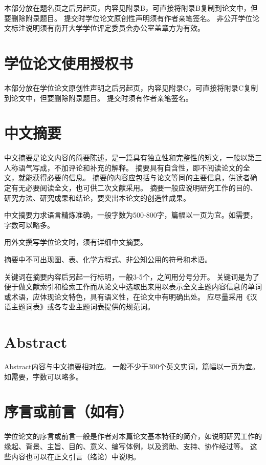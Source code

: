 本部分放在题名页之后另起页，内容见附录B，可直接将附录B复制到论文中，但要删除附录题目。
提交时学位论文原创性声明须有作者亲笔签名。
非公开学位论文标注说明须有南开大学学位评定委员会办公室盖章方为有效。

\section{学位论文使用授权书}

本部分放在学位论文原创性声明之后另起页，内容见附录C，可直接将附录C复制到论文中，但要删除附录题目。
提交时须有作者亲笔签名。

\section{中文摘要}

中文摘要是论文内容的简要陈述，是一篇具有独立性和完整性的短文，一般以第三人称语气写成，不加评论和补充的解释。
摘要具有自含性，即不阅读论文的全文，就能获得必要的信息。
摘要的内容应包括与论文等同的主要信息，供读者确定有无必要阅读全文，也可供二次文献采用。
摘要一般应说明研究工作的目的、研究方法、研究成果和结论，要突出本论文的创造性成果。

中文摘要力求语言精炼准确，一般字数为500-800字，篇幅以一页为宜。如需要，字数可以略多。

用外文撰写学位论文时，须有详细中文摘要。

摘要中不可出现图、表、化学方程式、非公知公用的符号和术语。

关键词在摘要内容后另起一行标明，一般3-5个，之间用分号分开。
关键词是为了便于做文献索引和检索工作而从论文中选取出来用以表示全文主题内容信息的单词或术语，应体现论文特色，具有语义性，在论文中有明确出处。
应尽量采用《汉语主题词表》或各专业主题词表提供的规范词。

\section{Abstract}

Abstract内容与中文摘要相对应。
一般不少于300个英文实词，篇幅以一页为宜。
如需要，字数可以略多。

\section{序言或前言（如有）}

学位论文的序言或前言一般是作者对本篇论文基本特征的简介，如说明研究工作的缘起、背景、主旨、目的、意义、编写体例，以及资助、支持、协作经过等。
这些内容也可以在正文引言（绪论）中说明。

